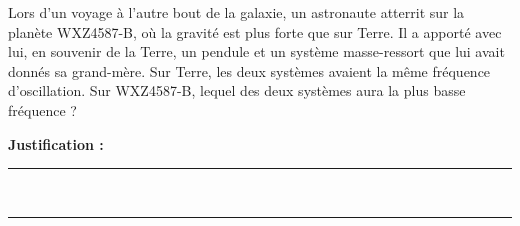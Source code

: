 Lors d’un voyage à l’autre bout de la galaxie, un astronaute atterrit sur la planète WXZ4587-B, où la gravité est plus forte que sur Terre. Il a apporté avec lui, en souvenir de la Terre, un pendule et un système masse-ressort que lui avait donnés sa grand-mère. Sur Terre, les deux systèmes avaient la même fréquence d’oscillation. Sur WXZ4587-B, lequel des deux systèmes aura la plus basse fréquence ?

\choices
\noindent\textbf{Justification :} \hrulefill \\[2.5ex]
\rule{\linewidth}{0.4pt} \\[2.5ex]
\rule{\linewidth}{0.4pt}
\vfill